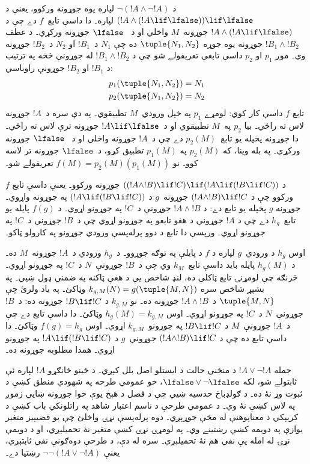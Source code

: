\documentclass[../../../include/open-logic-section]{subfiles}
\begin{document}
\begin{ex}
د $\lnot(!A \land \lnot !A)$ لپاره يوه جوړونه ورکوو، يعنې د $(!A
\land (!A \lif \lfalse)) \lif \lfalse$ لپاره۔ دا داسې تابع~$f$
دے چې د $!A \land (!A \lif \lfalse)$ جوړونه~$M$ واخلي او د
~$\lfalse$ جوړونه ورکړي۔ د عطف $!B_1 \land !B_2$ جوړونه يوه
جوړه $\tuple{N_1, N_2}$ ده چې $N_1$ د~$!B_1$ او $N_2$ د~$!B_2$
جوړونه وي۔ موږ $p_1$ او $p_2$ داسې تابعې تعريفولے شو چې د
$!B_1 \land !B_2$ له جوړونې څخه په ترتيب د $!B_1$ او $!B_2$
جوړونې راوباسي:
\begin{align*}
  p_1(\tuple{N_1, N_2}) &= N_1\\
  p_2(\tuple{N_1, N_2}) &= N_2
\end{align*}
تابع $f$ داسې کار کوي: لومړے $p_1$ په خپل ورودي~$M$ تطبيقوي۔
په دې سره د~$!A$ جوړونه لاس ته راځي۔ بيا $p_2$ په~$M$
تطبيقوي او د~$!A \lif \lfalse$ جوړونه ترې لاس ته راځي۔ دا
جوړونه پخپله يو تابع~$p_2(M)$ دے چې د~$!A$ جوړونه واخلي او د
~$\lfalse$ جوړونه ورکړي۔ په بله وينا، که $p_2(M)$ په $p_1(M)$
تطبيق کړو، د~$\lfalse$ جوړونه تر لاسه کوو۔ نو
$f(M) = p_2(M)(p_1(M))$ تعريفولے شو۔
\end{ex}

\begin{ex}
د $((!A \land !B) \lif !C) \lif (!A \lif
(!B \lif !C))$ جوړونه ورکوو۔ يعنې داسې تابع $f$ ورکوو چې د
$(!A \land !B) \lif !C$ جوړونه~$g$ د $(!A \lif (!B \lif
!C))$ په جوړونه واړوي۔ جوړونه $g$ پخپله يو تابع دے: د
$!A \land !B$ جوړونې د~$!C$ په جوړونو اړوي۔ د $f(g)$ پايله
يو تابع~$h_g$ دے چې د $!A$ جوړونې د هغو تابعو په جوړونو اړوي
چې د~$!B$ جوړونې د~$!C$ په جوړونو اړوي۔
ورپسې دا تابع د دوو پرله‌پسې ورودي جوړونو په کارولو ټاکو۔

اوس $h_g$ د ورودي~$g$ لپاره د $f$ د پايلې په توګه جوړوو۔ د~$h_g$ ورودي د~$!A$ جوړونه~$M$ ده۔ د
$h_g(M)$ پايله بايد داسې تابع~$k_M$ وي چې د~$!B$ جوړونې~$N$
د~$!C$ په جوړونو اړوي۔ څرنګه چې لومړنۍ تابع ټاکلې ده، لنډ
شاخص يې د هغې ټاکنه په ضمني ډول ښيي۔ په بشپړ شاخص سره
$k_{g,M}(N) = g(\tuple{M, N})$ وټاکئ۔
په ياد ولرئ چې $\tuple{M, N}$ د~$!A \land !B$ جوړونه ده۔ نو
$k_{g,M}$ د $!B \lif !C$ جوړونه ده: د~$!B$ جوړونې~$N$
د~$!C$ په جوړونو اړوي۔ اوس $h_g(M) = k_{g,M}$ وټاکئ۔ دا داسې
تابع دے چې د~$!A$ جوړونې~$M$ د $!B
\lif !C$ په جوړونو~$k_{g,M}$ اړوي۔ اوس $f(g) = h_g$ وټاکئ۔
دا داسې تابع ده چې د $(!A \land !B) \lif !C$ جوړونې~$g$
د $!A \lif (!B \lif !C)$ په جوړونو اړوي۔ همدا مطلوبه جوړونه ده۔
\end{ex}

جمله $!A \lor \lnot !A$ د منځني حالت د ايستلو اصل بلل کېږي۔ د ځينو
ځانګړو $!A$ لپاره ئې ثابتولے شو، لکه $\lfalse \lor
\lnot \lfalse$، خو عمومي طرحه په شهودي منطق کښې د ثبوت وړ نۀ ده۔
د ګولډباخ حدسيه ښيي چې د فصل د هېڅ يوې خوا جوړونه ښايي
زموږ په لاس کښې نۀ وي۔ د عمومي طرحې د ناسم اعتبار شاهد په راتلونکي
باب کښې د کرېپکي د معناپوهنې له مخې جوړېږي۔ دوه پرله‌پسې نړۍ
واخلئ چې يو قضيېيز متغير يوازې په دويمه کښې رښتينے وي۔ په
لومړۍ نړۍ کښې متغير نۀ تحميلېږي، او د دويمې نړۍ له امله يې
نفي هم نۀ تحميلېږي۔ سره له دې، د طرحې دوه‌ګونې نفي ثابتېږي،
يعنې $\lnot \lnot (!A
\lor \lnot !A)$ رښتيا دے۔
\end{document}
